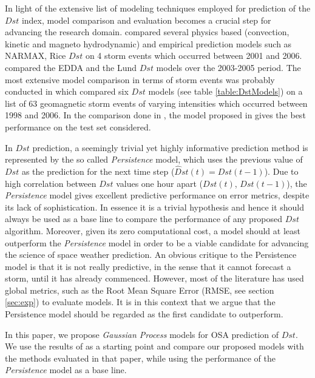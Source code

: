 \documentclass[referee,a4paper,12pt,traditabstract]{swsc}
\begin{document}
\begin{linenumbers}
In light of the extensive list of modeling techniques employed for prediction of the $Dst$ index, model comparison and evaluation becomes a crucial step for advancing the research domain. \citet{Rastatter2013} compared several physics based (convection, kinetic and magneto hydrodynamic) and empirical prediction models such as NARMAX, Rice $Dst$ on 4 storm events which occurred between 2001 and 2006. \citet{Amata2008} compared the EDDA and the Lund $Dst$ models over the 2003-2005 period. The most extensive model comparison in terms of storm events was probably conducted in \citet{Ji2012} which compared six $Dst$ models (see table \ref{table:DstModels}) on a list of 63 geomagnetic storm events of varying intensities which occurred between 1998 and 2006. In the comparison done in \citet{Ji2012}, the model proposed in \citet{JGRA:JGRA16300} gives the best performance on the test set considered. 

In $Dst$ prediction, a seemingly trivial yet highly informative prediction method is represented by the so called \emph{Persistence} model, which uses the previous value of $Dst$ as the prediction for the next time step ($\hat{D}st(t) = Dst(t-1)$). Due to high correlation between $Dst$ values one hour apart ($Dst(t)$, $Dst(t-1)$), the \emph{Persistence} model gives excellent predictive performance on error metrics, despite its lack of sophistication. In essence it is a trivial hypothesis and hence it should always be used as a base line to compare the performance of any proposed $Dst$ algorithm. Moreover, given its zero computational cost, a model should at least outperform the \emph{Persistence} model in order to be a viable candidate for advancing the science of space weather prediction. An obvious critique to the Persistence model is that it is not really predictive, in the sense that it cannot forecast a storm, until it has already commenced. However, most of the literature has used global metrics, such as the Root Mean Square Error (RMSE, see section \ref{sec:exp}) to evaluate models. It is in this context that we argue that the Persistence model should be regarded as the first candidate to outperform.

In this paper, we propose \emph{Gaussian Process} models for OSA prediction of $Dst$. We use the results of \citet{Ji2012} as a starting point and compare our proposed models with the methods evaluated in that paper, while using the performance of the \emph{Persistence} model as a base line. 


\end{linenumbers}
\end{document}
